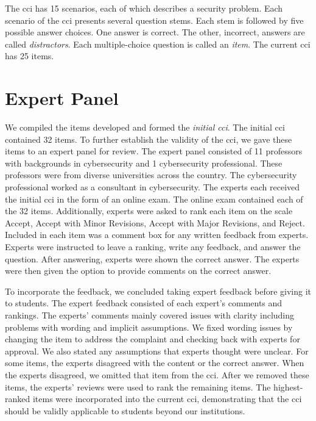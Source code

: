 The \gls{cci} has 15 scenarios, each of which describes a security problem. Each scenario of the \gls{cci} presents several question stems. Each stem is followed by five possible answer choices. One answer is correct. The other, incorrect, answers are called \textit{distractors}. Each multiple-choice question is called an \textit{item}. The current \gls{cci} has 25 items.



\section{Expert Panel}

We compiled the items developed and formed the \textit{initial \gls{cci}}.  The initial \gls{cci} contained 32 items. To further establish the validity of the \gls{cci}, we gave these items to an expert panel for review. The expert panel consisted of 11 professors with backgrounds in cybersecurity and 1 cybersecurity professional. These professors were from diverse universities across the country. The cybersecurity professional worked as a consultant in cybersecurity. The experts each received the initial \gls{cci} in the form of an online exam. The online exam contained each of the 32 items. Additionally, experts were asked to rank each item on the scale Accept, Accept with Minor Revisions, Accept with Major Revisions, and Reject. Included in each item was a comment box for any written feedback from experts. Experts were instructed to leave a ranking, write any feedback, and answer the question. After answering, experts were shown the correct answer. The experts were then given the option to provide comments on the correct answer. 


To incorporate the feedback, we concluded taking expert feedback before giving it to students. The expert feedback consisted of each expert's comments and rankings. The experts' comments mainly covered issues with clarity including problems with wording and implicit assumptions. We fixed wording issues by changing the item to address the complaint and checking back with experts for approval. We also stated any assumptions that experts thought were unclear. For some items, the experts disagreed with the content or the correct answer. When the experts disagreed, we omitted that item from the \gls{cci}. After we removed these items, the experts' reviews were used to rank the remaining items. The highest-ranked items were incorporated into the current \gls{cci}, demonstrating that the \gls{cci} should be validly applicable to students beyond our institutions.

